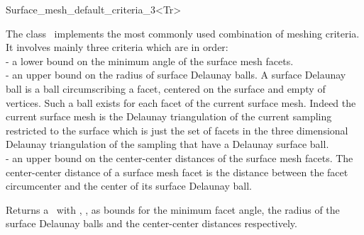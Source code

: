 
\begin{ccRefClass}{Surface_mesh_default_criteria_3<Tr>}

\ccDefinition
  
The class \ccRefName\  implements  the most commonly used combination
of meshing criteria. It involves mainly three criteria which are
in order: \\
- a lower bound on the minimum angle of the surface mesh facets. \\
- an upper bound on the radius of surface Delaunay balls.
 A surface Delaunay ball is a  ball circumscribing  a facet,
centered on the surface and empty of vertices.
 Such a ball exists for each facet
of the current surface mesh.
Indeed  the current surface mesh
is  the Delaunay triangulation of the current sampling restricted to
the surface 
which is just the set of facets in the three dimensional  Delaunay triangulation of
the sampling  that  have a Delaunay surface ball. \\
- an upper bound on the center-center distances of the surface mesh facets.
  The center-center distance of a surface mesh facet 
  is the distance between the facet circumcenter and the 
  center of its  surface Delaunay ball. 


\ccIsModel


\ccTypes


\ccCreation
{}

{Returns a \ccRefName\ with , ,
 as bounds for the minimum facet angle,
the radius of the surface Delaunay balls 
and the center-center distances respectively.}

\ccSeeAlso


\end{ccRefClass}


